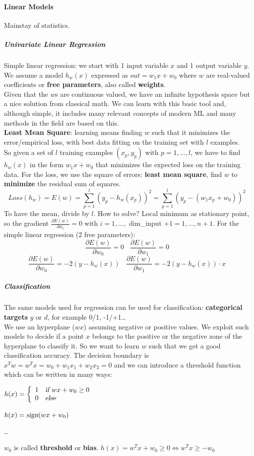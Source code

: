 \documentclass[10pt]{report}
\begin{document}
\paragraph{Linear Models} Mainstay of statistics.
\subparagraph{Univariate Linear Regression} Simple linear regression: we start with 1 input variable $x$ and 1 output variable $y$. We assume a model $h_w(x)$ expressed as $out = w_1x + w_0$ where $w$ are real-valued coefficients or \textbf{free parameters}, also called \textbf{weights}.\\
Given that the $w$s are continuous valued, we have an infinite hypothesis space but a nice solution from classical math. We can learn with this basic tool and, although simple, it includes many relevant concepts of modern ML and many methods in the field are based on this.\\
\textbf{Least Mean Square}: learning means finding $w$ such that it minimizes the error/empirical loss, with best data fitting on the training set with $l$ examples.\\
So given a set of $l$ training examples $(x_p, y_p)$ with $p = 1,\ldots,l$, we have to find $h_w(x)$ in the form $w_1x + w_0$ that minimizes the expected loss on the training data. For the loss, we use the square of errors: \textbf{least mean square}, find $w$ to \textbf{minimize} the residual sum of squares.
$$Loss(h_w) = E(w) = \sum_{p=1}^l (y_p - h_w(x_p))^2 = \sum_{p=1}^l (y_p - (w_1x_p + w_0))^2$$
To have the mean, divide by $l$. How to solve? Local minimum as stationary point, so the gradient $\frac{\partial E(w)}{\partial w_i} = 0$ with $i = 1,\ldots,$ dim\_input $+1 = 1,\ldots, n+1$. For the simple linear regression (2 free parameters):
$$\frac{\partial E(w)}{\partial w_0} = 0\:\:\:\:\frac{\partial E(w)}{\partial w_1} = 0$$
$$\frac{\partial E(w)}{\partial w_0} = -2(y - h_w(x))\:\:\:\:\frac{\partial E(w)}{\partial w_1} = -2(y - h_w(x))\cdot x$$
\subparagraph{Classification} The same models used for regression can be used for classification: \textbf{categorical targets} $y$ or $d$, for example 0/1, -1/+1\ldots\\
We use an hyperplane ($wx$) assuming negative or positive values. We exploit such models to decide if a point $x$ belongs to the positive or the negative zone of the hyperplane to classify it. So we want to learn $w$ such that we get a good classification accuracy. The decision boundary is $x^Tw = w^Tx = w_0 + w_1x_1 + w_2x_2 = 0$ and we can introduce a threshold function which can be written in many ways: \begin{list}{}{}
	\item $h(x) = \left\{\begin{array}{c l}
	1 & \textsl{if }wx + w_0 \geq 0\\
	0 & \textsl{else}
\end{array}	 \right.$
	\item $h(x) = \textsl{sign}(wx + w_0)$
	\item \ldots
\end{list}
$w_0$ is called \textbf{threshold} or \textbf{bias}. $h(x) = w^Tx + w_0 \geq 0 \Leftrightarrow w^Tx \geq -w_0$
\end{document}
